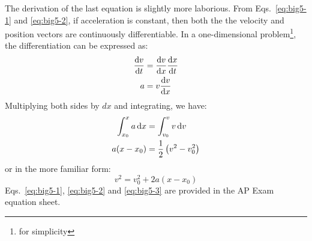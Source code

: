 \documentclass{../../../oss-handout}
\begin{document}
The derivation of the last equation is slightly more laborious. From
Eqs.~\ref{eq:big5-1} and \ref{eq:big5-2}, if acceleration is constant, then
both the the velocity and position vectors are continuously differentiable. In
a one-dimensional problem\footnote{for simplicity}, the differentiation can be
expressed as:
\begin{align*}
  \diff vt&=\diff vx\diff xt\\
  a&=v\diff vx
\end{align*}
Multiplying both sides by $dx$ and integrating, we have:
\begin{align*}
  \int_{x_0}^x a\dl x&=\int_{v_0}^v v\dl v\\
  a(x-x_0)&=\frac12\left(v^2-v_0^2\right)
\end{align*}
or in the more familiar form:
\begin{equation}
  \boxed{v^2 = v_0^2+ 2a(x-x_0)}
  \label{eq:big5-3}
\end{equation}
Eqs.~\ref{eq:big5-1}, \ref{eq:big5-2} and \ref{eq:big5-3} are provided in the
AP Exam equation sheet.
%  
%
\end{document}
